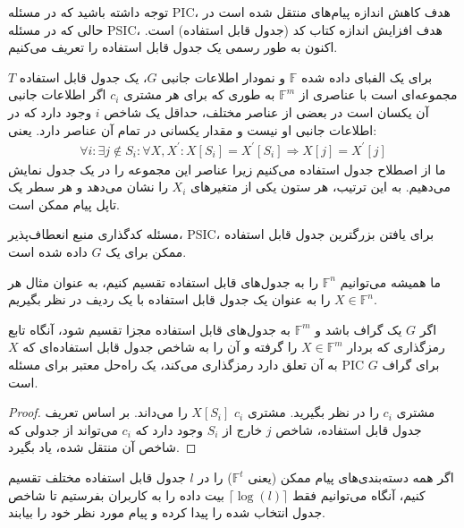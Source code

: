 توجه داشته باشید که در مسئله PIC، هدف کاهش اندازه پیام‌های منتقل شده است در حالی که در مسئله PSIC، هدف افزایش اندازه کتاب کد (جدول قابل استفاده) است. اکنون به طور رسمی یک جدول قابل استفاده را تعریف می‌کنیم.


\begin{definition}\label{def1}
برای یک الفبای داده شده $\mathbb{F}$ و نمودار اطلاعات جانبی $G$، یک جدول قابل استفاده $T$ مجموعه‌ای است با عناصری از $\mathbb{F}^m$ به طوری که برای هر مشتری $c_i$ اگر اطلاعات جانبی آن یکسان است در بعضی از عناصر مختلف، حداقل یک شاخص $i$ وجود دارد که در اطلاعات جانبی او نیست و مقدار یکسانی در تمام آن عناصر دارد. یعنی:
\begin{align*}
    \forall i: \exists j \notin S_i: \forall X, X^\prime: X[S_i] = {X^\prime}[S_i]  \Rightarrow X[j] = {X^\prime}[j]
\end{align*}
ما از اصطلاح جدول استفاده می‌کنیم زیرا عناصر این مجموعه را در یک جدول نمایش می‌دهیم. به این ترتیب، هر ستون یکی از متغیرهای $X_i$ را نشان می‌دهد و هر سطر یک تاپل پیام ممکن است.
\end{definition}

مسئله کدگذاری منبع انعطاف‌پذیر، PSIC، برای یافتن بزرگترین جدول قابل استفاده ممکن برای یک $G$ داده شده است.

\begin{remark}
    ما همیشه می‌توانیم $\mathbb{F}^n$ را به جدول‌های قابل استفاده تقسیم کنیم، به عنوان مثال هر $X \in \mathbb{F}^n$ را به عنوان یک جدول قابل استفاده با یک ردیف در نظر بگیریم.
\end{remark}

\begin{lemma}
    اگر $G$ یک گراف باشد و $\mathbb{F}^m$ به جدول‌های قابل استفاده مجزا تقسیم شود، آنگاه تابع رمزگذاری که بردار $X \in \mathbb{F}^m$ را گرفته و آن را به شاخص جدول قابل استفاده‌ای که $X$ به آن تعلق دارد رمزگذاری می‌کند، یک راه‌حل معتبر برای مسئله PIC برای گراف $G$ است.
\end{lemma}
\begin{proof}
    مشتری $c_i$ را در نظر بگیرید. مشتری $c_i$ $X[S_i]$ را می‌داند. بر اساس تعریف جدول قابل استفاده، شاخص $j$ خارج از $S_i$ وجود دارد که $c_i$ می‌تواند از جدولی که شاخص آن منتقل شده، یاد بگیرد.
\end{proof}

\begin{corollary}\label{cor1}
اگر همه دسته‌بندی‌های پیام ممکن (یعنی $\mathbb{F}^t$) را در $l$ جدول قابل استفاده مختلف تقسیم کنیم، آنگاه می‌توانیم فقط $\lceil \log(l) \rceil$ بیت داده را به کاربران بفرستیم تا شاخص جدول انتخاب شده را پیدا کرده و پیام مورد نظر خود را بیابند.
\end{corollary}

